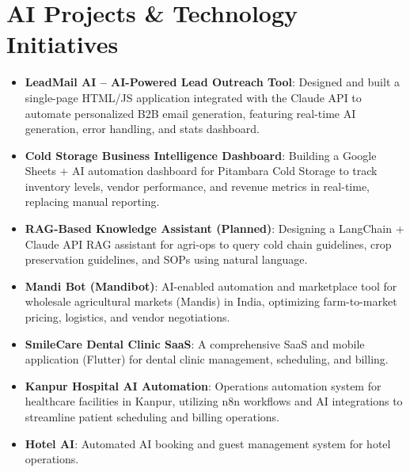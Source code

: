 \documentclass[11pt,a4paper,sans]{moderncv}
\begin{document}
{\begin{itemize}
\end{itemize}


\section{AI Projects \& Technology Initiatives}
\vspace{1pt}
\begin{itemize}

\item \textbf{LeadMail AI -- AI-Powered Lead Outreach Tool}: Designed and built a single-page HTML/JS application integrated with the Claude API to automate personalized B2B email generation, featuring real-time AI generation, error handling, and stats dashboard.

\item \textbf{Cold Storage Business Intelligence Dashboard}: Building a Google Sheets + AI automation dashboard for Pitambara Cold Storage to track inventory levels, vendor performance, and revenue metrics in real-time, replacing manual reporting.

\item \textbf{RAG-Based Knowledge Assistant (Planned)}: Designing a LangChain + Claude API RAG assistant for agri-ops to query cold chain guidelines, crop preservation guidelines, and SOPs using natural language.

\item \textbf{Mandi Bot (Mandibot)}: AI-enabled automation and marketplace tool for wholesale agricultural markets (Mandis) in India, optimizing farm-to-market pricing, logistics, and vendor negotiations.

\item \textbf{SmileCare Dental Clinic SaaS}: A comprehensive SaaS and mobile application (Flutter) for dental clinic management, scheduling, and billing.

\item \textbf{Kanpur Hospital AI Automation}: Operations automation system for healthcare facilities in Kanpur, utilizing n8n workflows and AI integrations to streamline patient scheduling and billing operations.

\item \textbf{Hotel AI}: Automated AI booking and guest management system for hotel operations.


\end{itemize}}
\end{document}
